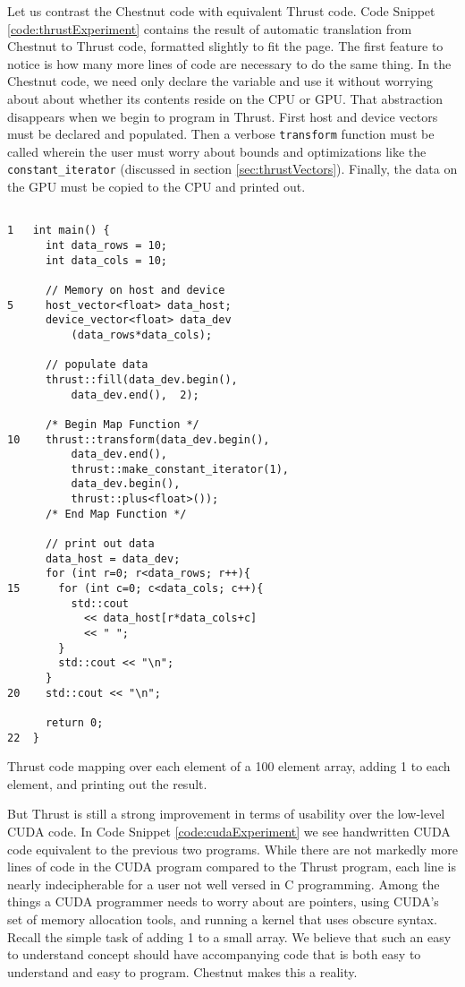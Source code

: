\documentclass[twocolumn]{article}
\renewcommand{\|}{\origbar} %
\newcommand{\code}[1]{\texttt{#1}}
\begin{document}
Let us contrast the Chestnut code with equivalent Thrust code. Code Snippet \ref{code:thrustExperiment} contains the result of automatic translation from Chestnut to Thrust code, formatted slightly to fit the page. The first feature to notice is how many more lines of code are necessary to do the same thing. In the Chestnut code, we need only declare the variable and use it without worrying about about whether its contents reside on the CPU or GPU. That abstraction disappears when we begin to program in Thrust. First host and device vectors must be declared and populated. Then a verbose \code{transform} function must be called wherein the user must worry about bounds and optimizations like the \code{constant\_iterator} (discussed in section \ref{sec:thrustVectors}). Finally, the data on the GPU must be copied to the CPU and printed out. 

\begin{Code Snippet}
\begin{verbatim}

1   int main() {
      int data_rows = 10;
      int data_cols = 10;

      // Memory on host and device
5     host_vector<float> data_host; 
      device_vector<float> data_dev
          (data_rows*data_cols); 

      // populate data
      thrust::fill(data_dev.begin(),
          data_dev.end(),  2);

      /* Begin Map Function */
10    thrust::transform(data_dev.begin(), 
          data_dev.end(), 
          thrust::make_constant_iterator(1), 
          data_dev.begin(), 
          thrust::plus<float>()); 
      /* End Map Function */

      // print out data
      data_host = data_dev;
      for (int r=0; r<data_rows; r++){
15      for (int c=0; c<data_cols; c++){
          std::cout
            << data_host[r*data_cols+c]
            << " ";
        }
        std::cout << "\n";
      }
20    std::cout << "\n";

      return 0;
22  }
\end{verbatim}
\caption{Thrust code mapping over each element of a 100 element array, adding 1 to each element, and printing out the result.}
\label{code:thrustExperiment}
\end{Code Snippet}

But Thrust is still a strong improvement in terms of usability over the low-level CUDA code. In Code Snippet \ref{code:cudaExperiment} we see handwritten CUDA code equivalent to the previous two programs. While there are not markedly more lines of code in the CUDA program compared to the Thrust program, each line is nearly indecipherable for a user not well versed in C programming. Among the things a CUDA programmer needs to worry about are pointers, using CUDA's set of memory allocation tools, and running a kernel that uses obscure syntax. Recall the simple task of adding 1 to a small array. We believe that such an easy to understand concept should have accompanying code that is both easy to understand and easy to program. Chestnut makes this a reality.
\end{document}
